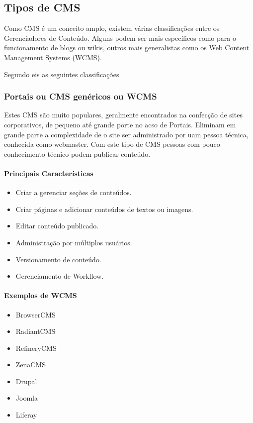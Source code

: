 \subsection{Tipos de CMS}

Como CMS é um conceito amplo, existem várias classificações entre os Gerenciadores de Conteúdo. Alguns podem ser mais específicos como para o funcionamento de blogs ou wikis, outros mais generalistas como os Web Content Management Systems (WCMS).

Segundo \cite{choosing_open_source_cms} eis as seguintes classificações

\subsubsection{Portais ou CMS genéricos ou WCMS} 

Estes CMS são muito populares, geralmente encontrados na confecção de sites corporativos, de pequeno até grande porte no acso de Portais. Eliminam em grande parte a complexidade de o site ser administrado por uam pessoa técnica, conhecida como webmaster. Com este tipo de CMS pessoas com pouco conhecimento técnico podem publicar conteúdo.

\paragraph{Principais Características}

\begin{itemize}
  \item Criar a gerenciar seções de conteúdos.
  \item Criar páginas e adicionar conteúdos de textos ou imagens.
  \item Editar conteúdo publicado.
  \item Administração por múltiplos usuários.
  \item Versionamento de conteúdo.
  \item Gerenciamento de Workflow.
\end{itemize}

\paragraph{Exemplos de WCMS} 

\begin{itemize}
  \item BrowserCMS
  \item RadiantCMS
  \item RefineryCMS
  \item ZenaCMS
  \item Drupal
  \item Joomla
  \item Liferay
\end{itemize}  


